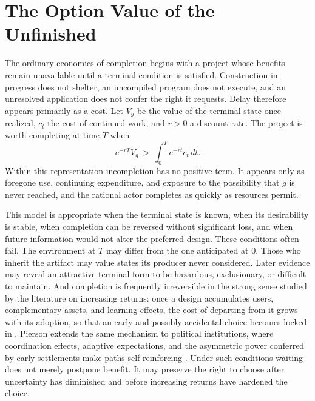 \section{The Option Value of the Unfinished}\label{sec:option}

The ordinary economics of completion begins with a project whose benefits remain unavailable until a terminal condition is satisfied. Construction in progress does not shelter, an uncompiled program does not execute, and an unresolved application does not confer the right it requests. Delay therefore appears primarily as a cost. Let $V_g$ be the value of the terminal state once realized, $c_t$ the cost of continued work, and $r>0$ a discount rate. The project is worth completing at time $T$ when
\begin{equation}
e^{-rT}V_g\ >\ \int_0^Te^{-rt}c_t\,dt.
\end{equation}
Within this representation incompletion has no positive term. It appears only as foregone use, continuing expenditure, and exposure to the possibility that $g$ is never reached, and the rational actor completes as quickly as resources permit.

This model is appropriate when the terminal state is known, when its desirability is stable, when completion can be reversed without significant loss, and when future information would not alter the preferred design. These conditions often fail. The environment at $T$ may differ from the one anticipated at $0$. Those who inherit the artifact may value states its producer never considered. Later evidence may reveal an attractive terminal form to be hazardous, exclusionary, or difficult to maintain. And completion is frequently irreversible in the strong sense studied by the literature on increasing returns: once a design accumulates users, complementary assets, and learning effects, the cost of departing from it grows with its adoption, so that an early and possibly accidental choice becomes locked in \cite{arthur1989}. Pierson extends the same mechanism to political institutions, where coordination effects, adaptive expectations, and the asymmetric power conferred by early settlements make paths self-reinforcing \cite{pierson2000}. Under such conditions waiting does not merely postpone benefit. It may preserve the right to choose after uncertainty has diminished and before increasing returns have hardened the choice.

